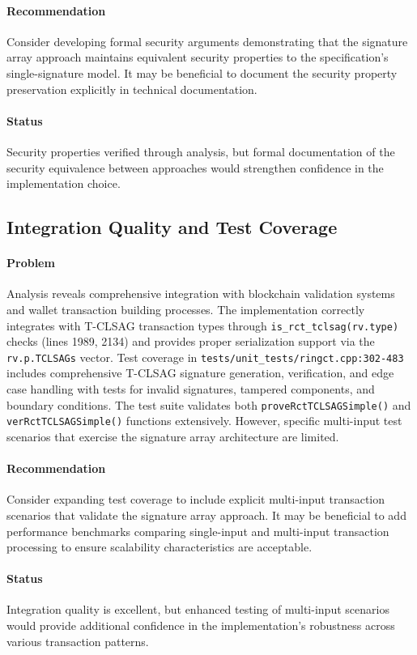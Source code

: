 \documentclass{article}
\begin{document}
\paragraph{Recommendation}
Consider developing formal security arguments demonstrating that the signature 
array approach maintains equivalent security properties to the specification's 
single-signature model.  It may be beneficial to document the security property 
preservation explicitly in technical documentation.

\paragraph{Status}
Security properties verified through analysis, but formal documentation of 
the security equivalence between approaches would strengthen confidence in 
the implementation choice.

\subsection{Integration Quality and Test Coverage}
\paragraph{Problem}
Analysis reveals comprehensive integration with blockchain validation systems 
and wallet transaction building processes.  The implementation correctly 
integrates with T-CLSAG transaction types through \texttt{is\_rct\_tclsag(rv.type)} 
checks (lines 1989, 2134) and provides proper serialization support via the 
\texttt{rv.p.TCLSAGs} vector.  Test coverage in \texttt{tests/unit\_tests/ringct.cpp:302-483} 
includes comprehensive T-CLSAG signature generation, verification, and edge case handling 
with tests for invalid signatures, tampered components, and boundary conditions.  
The test suite validates both \texttt{proveRctTCLSAGSimple()} and \texttt{verRctTCLSAGSimple()} 
functions extensively. However, specific multi-input test scenarios that exercise 
the signature array architecture are limited.

\paragraph{Recommendation}
Consider expanding test coverage to include explicit multi-input transaction 
scenarios that validate the signature array approach.  It may be beneficial 
to add performance benchmarks comparing single-input and multi-input 
transaction processing to ensure scalability characteristics are acceptable.

\paragraph{Status}
Integration quality is excellent, but enhanced testing of multi-input 
scenarios would provide additional confidence in the implementation's 
robustness across various transaction patterns.
\end{document}
